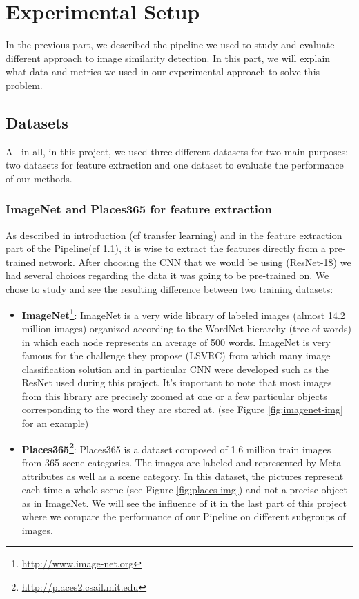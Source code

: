 \documentclass[a4paper]{article}
\begin{document}
\section{Experimental Setup}

In the previous part, we described the pipeline we used to study and evaluate different approach to image similarity detection. In this part, we will explain what data and metrics we used in our experimental approach to solve this problem.

\subsection{Datasets}
All in all, in this project, we used three different datasets for two main purposes: two datasets for feature extraction and one dataset to evaluate the performance of our methods.

\subsubsection{ImageNet and Places365 for feature extraction}
As described in introduction (cf transfer learning) and in the feature extraction part of the Pipeline(cf 1.1), it is wise to extract the features directly from a pre-trained network. After choosing the CNN that we would be using (ResNet-18) we had several choices regarding the data it was going to be pre-trained on. We chose to study and see the resulting difference between two training datasets: 
\begin{itemize}  
	\item \textbf{ImageNet\footnote{\url{http://www.image-net.org}}}: ImageNet is a very wide library of labeled images (almost 14.2 million images) organized according to the WordNet hierarchy (tree of words) in which each node represents an average of 500 words. ImageNet is very famous for the challenge they propose (LSVRC) from which many image classification solution and in particular CNN were developed such as the ResNet used during this project. It's important to note that most images from this library are precisely zoomed at one or a few particular objects corresponding to the word they are stored at. (see Figure \ref{fig:imagenet-img} for an example)  
	\item \textbf{Places365\footnote{\url{http://places2.csail.mit.edu}}}: Places365 is a dataset composed of 1.6 million train images from  365 scene categories. The images are labeled and represented by Meta attributes as well as a scene category. In this dataset, the pictures represent each time a whole scene (see Figure \ref{fig:places-img}) and not a precise object as in ImageNet. We will see the influence of it in the last part of this project where we compare the performance of our Pipeline on different subgroups of images.
\end{itemize}
\end{document}
